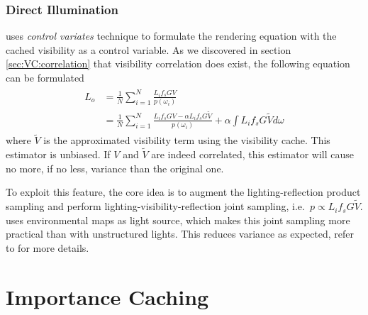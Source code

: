 \documentclass[]{book}
\begin{document}
\subsection{Direct Illumination}
\label{sec:VC:render:direct}
\citeauthor{clarberg2008VisCorrelation} uses \textit{control variates} technique to formulate the rendering equation with the cached visibility as a control variable.
As we discovered in section \ref{sec:VC:correlation} that visibility correlation does exist, the following equation can be formulated
\begin{gather*}
\begin{aligned}
	\widehat{L}_o &= \frac{1}{N} \sum_{i=1}^{N}\frac{L_i f_s G V}{p(\omega_i)} \\
	&= \frac{1}{N} \sum_{i=1}^{N}\frac{L_i f_s G V - \alpha L_i f_s G \widetilde{V}}{p(\omega_i)} + \alpha \int L_i f_s G \widetilde{V} d\omega
\end{aligned}
\end{gather*}
where  $\widetilde{V}$ is the approximated visibility term using the visibility cache.
This estimator is unbiased.
If $V$ and $\widetilde{V}$ are indeed correlated, this estimator will cause no more, if no less, variance than the original one.

To exploit this feature, the core idea is to augment the lighting-reflection product sampling and perform lighting-visibility-reflection joint sampling, i.e.\ $p \propto L_i f_s G \widetilde{V}$.
\citeauthor{clarberg2008VisCorrelation} uses environmental maps as light source, which makes this joint sampling more practical than with unstructured lights.
This reduces variance as expected, refer to \cite{clarberg2008VisCorrelation} for more details.

\chapter{Importance Caching}
\label{chap:imp_cache}
\end{document}
